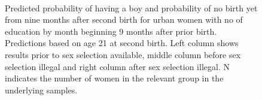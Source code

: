 \documentclass[12pt,letterpaper]{article}
\begin{document}
\begin{figure}[htpb]
{\begin{minipage}{0.26\textwidth}
        \captionsetup[subfigure]{labelformat=empty,position=top,captionskip=-1pt,farskip=-0.5pt}
        \\
        \captionsetup[subfigure]{labelformat=parens}
    \end{minipage}
}
\setcounter{subfigure}{3}
\caption{Predicted probability of having a boy and probability of
no birth yet from nine months after second birth for urban 
women with no of education by month beginning 9 months after prior birth. 
Predictions based on age 21 at second birth.
Left column shows results prior to sex selection available, middle column before
sex selection illegal and right column after sex selection illegal.
N indicates the number of women in the relevant group in the underlying samples.
}
\label{fig:results_spell3_low_urban}
\end{figure}
\end{document}
